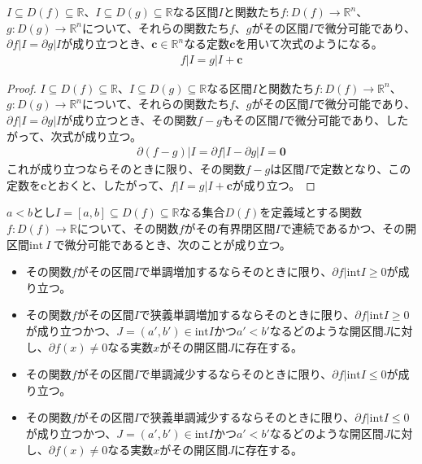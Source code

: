 \documentclass[dvipdfmx]{jsarticle}
\begin{document}
\begin{thm}\label{4.2.2.5}
$I \subseteq D(f) \subseteq \mathbb{R}$、$I \subseteq D(g) \subseteq \mathbb{R}$なる区間$I$と関数たち$f:D(f) \rightarrow \mathbb{R}^{n}$、$g:D(g) \rightarrow \mathbb{R}^{n}$について、それらの関数たち$f$、$g$がその区間$I$で微分可能であり、$\partial f|I = \partial g|I$が成り立つとき、$\mathbf{c} \in \mathbb{R}^{n}$なる定数$\mathbf{c}$を用いて次式のようになる。
\begin{align*}
f|I = g|I + \mathbf{c}
\end{align*}
\end{thm}
\begin{proof}
$I \subseteq D(f) \subseteq \mathbb{R}$、$I \subseteq D(g) \subseteq \mathbb{R}$なる区間$I$と関数たち$f:D(f) \rightarrow \mathbb{R}^{n}$、$g:D(g) \rightarrow \mathbb{R}^{n}$について、それらの関数たち$f$、$g$がその区間$I$で微分可能であり、$\partial f|I = \partial g|I$が成り立つとき、その関数$f - g$もその区間$I$で微分可能であり、したがって、次式が成り立つ。
\begin{align*}
\partial(f - g)|I = \partial f|I - \partial g|I = \mathbf{0}
\end{align*}
これが成り立つならそのときに限り、その関数$f - g$は区間$I$で定数となり、この定数を$\mathbf{c}$とおくと、したがって、$f|I = g|I + \mathbf{c}$が成り立つ。
\end{proof}
\begin{thm}\label{4.2.2.6}
$a < b$とし$I = [ a,b] \subseteq D(f) \subseteq \mathbb{R}$なる集合$D(f)$を定義域とする関数$f:D(f) \rightarrow \mathbb{R}$について、その関数$f$がその有界閉区間$I$で連続であるかつ、その開区間$\mathrm{int}\left. \ I \right.\ $で微分可能であるとき、次のことが成り立つ。
\begin{itemize}
\item
  その関数$f$がその区間$I$で単調増加するならそのときに限り、$\partial f|\mathrm{int}I \geq 0$が成り立つ。
\item
  その関数$f$がその区間$I$で狭義単調増加するならそのときに限り、$\partial f|\mathrm{int}I \geq 0$が成り立つかつ、$J = \left( a',b' \right) \in \mathrm{int}I$かつ$a' < b'$なるどのような開区間$J$に対し、$\partial f(x) \neq 0$なる実数$x$がその開区間$J$に存在する。
\item
  その関数$f$がその区間$I$で単調減少するならそのときに限り、$\partial f|\mathrm{int}I \leq 0$が成り立つ。
\item
  その関数$f$がその区間$I$で狭義単調減少するならそのときに限り、$\partial f|\mathrm{int}I \leq 0$が成り立つかつ、$J = \left( a',b' \right) \in \mathrm{int}I$かつ$a' < b'$なるどのような開区間$J$に対し、$\partial f(x) \neq 0$なる実数$x$がその開区間$J$に存在する。
\end{itemize}
\end{thm}
\end{document}
